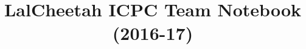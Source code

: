 \documentclass[8pt]{article}
\title{\vspace{-4ex}\Large{LalCheetah ICPC Team Notebook (2016-17)}}
\author{}
\date{}
\begin{document}
\begin{landscape}
\begin{multicols}{3}

\maketitle
\vspace{-13ex}
\tableofcontents
\pagestyle{fancy}



\end{multicols}

\pagebreak

\begin{multicols}{2}


\end{multicols}

\pagebreak



\end{landscape}
\end{document}
